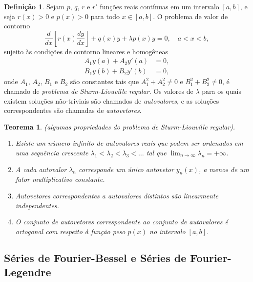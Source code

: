 \documentclass{article}
\theoremstyle{plain}
\newtheorem{thm}{Teorema}[section]
\theoremstyle{definition}
\newtheorem{defn}{Definição}[section]
\theoremstyle{remark}
\begin{document}
\begin{defn}
    Sejam \(p\), \(q\), \(r\) e \(r'\) funções reais contínuas em um intervalo \([a,b]\), e seja \(r(x)>0\) e \(p(x)>0\) para todo \(x \in [a,b]\). O problema de valor de contorno
    \begin{equation}
        \frac{d}{dx}\left[r(x)\frac{dy}{dx}\right] + q(x)y + \lambda p(x)y = 0, \quad a < x < b,
    \end{equation}
    \noindent sujeito às condições de contorno lineares e homogêneas
    \begin{align}
        A_1 y(a) + A_2 y'(a) &= 0, \\
        B_1 y(b) + B_2 y'(b) &= 0,
    \end{align}
    \noindent onde \(A_1\), \(A_2\), \(B_1\) e \(B_2\) são constantes tais que \(A_1^2 + A_2^2 \neq 0\) e \(B_1^2 + B_2^2 \neq 0\), é chamado de \emph{problema de Sturm-Liouville regular}. Os valores de \(\lambda\) para os quais existem soluções não-triviais são chamados de \emph{autovalores}, e as soluções correspondentes são chamadas de \emph{autovetores}.
\end{defn}

\begin{thm} (algumas propriedades do problema de Sturm-Liouville regular).
    \begin{enumerate}
        \item[\textup{(a)}] Existe um número infinito de autovalores reais que podem ser ordenados em uma sequência crescente \( \lambda_1 < \lambda_2 < \lambda_3 < \ldots \) tal que \( \lim_{n \to \infty} \lambda_n = +\infty \).
        \item[\textup{(b)}] A cada autovalor \( \lambda_n \) corresponde um único autovetor \( y_n(x) \), a menos de um fator multiplicativo constante.
        \item[\textup{(c)}] Autovetores correspondentes a autovalores distintos são linearmente independentes.
        \item[\textup{(d)}] O conjunto de autovetores correspondente ao conjunto de autovalores é ortogonal com respeito à função peso \( p(x) \) no intervalo \([a,b]\).
    \end{enumerate}
\end{thm}

\subsection{Séries de Fourier-Bessel e Séries de Fourier-Legendre}
\end{document}
